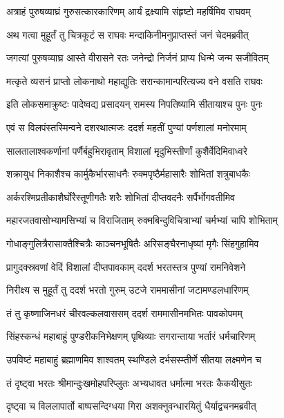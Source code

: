 \twolineshloka
{अत्राहं पुरुषव्याघ्रं गुरुसत्कारकारिणम्}
{आर्यं द्रक्ष्यामि संहृष्टो महर्षिमिव राघवम्} %

\twolineshloka
{अथ गत्वा मुहूर्तं तु चित्रकूटं स राघवः}
{मन्दाकिनीमनुप्राप्तस्तं जनं चेदमब्रवीत्} %

\twolineshloka
{जगत्यां पुरुषव्याघ्र आस्ते वीरासने रतः}
{जनेन्द्रो निर्जनं प्राप्य धिन्मे जन्म सजीवितम्} %

\twolineshloka
{मत्कृते व्यसनं प्राप्तो लोकनाथो महाद्युतिः}
{सरान्कामान्परित्यज्य वने वसति राघवः} %

\twolineshloka
{इति लोकसमाक्रुष्टः पादेष्वद्य प्रसादयन्}
{रामस्य निपतिष्यामि सीतायाश्च पुनः पुनः} %

\twolineshloka
{एवं स विलपंस्तस्मिन्वने दशरथात्मजः}
{ददर्श महतीं पुण्यां पर्णशालां मनोरमाम्} %

\twolineshloka
{सालतालाश्वकर्णानां पर्णैर्बहुभिरावृताम्}
{विशालां मृदुभिस्तीर्णां कुशैर्वेदिमिवाध्वरे} %

\twolineshloka
{शक्रायुध निकाशैश्च कार्मुकैर्भारसाधनैः}
{रुक्मपृष्ठैर्महासारैः शोभितां शत्रुबाधकैः} %

\twolineshloka
{अर्करश्मिप्रतीकाशैर्घोरैस्तूणीगतैः शरैः}
{शोभितां दीप्तवदनैः सर्पैर्भोगवतीमिव} %

\twolineshloka
{महारजतवासोभ्यामसिभ्यां च विराजिताम्}
{रुक्मबिन्दुविचित्राभ्यां चर्मभ्यां चापि शोभिताम्} %

\twolineshloka
{गोधाङ्गुलित्रैरासाक्तैश्चित्रैः काञ्चनभूषितैः}
{अरिसङ्घैरनाधृष्यां मृगैः सिंहगुहामिव} %

\twolineshloka
{प्रागुदक्स्रवणां वेदिं विशालां दीप्तपावकाम्}
{ददर्श भरतस्तत्र पुण्यां रामनिवेशने} %

\twolineshloka
{निरीक्ष्य स मुहूर्तं तु ददर्श भरतो गुरुम्}
{उटजे राममासीनां जटामण्डलधारिणम्} %

\twolineshloka
{तं तु कृष्णाजिनधरं चीरवल्कलवाससम्}
{ददर्श राममासीनमभितः पावकोपमम्} %

\twolineshloka
{सिंहस्कन्धं महाबाहुं पुण्डरीकनिभेक्षणम्}
{पृथिव्याः सगरान्ताया भर्तारं धर्मचारिणम्} %

\twolineshloka
{उपविष्टं महाबाहुं ब्रह्माणमिव शाश्वतम्}
{स्थण्डिले दर्भसस्म्तीर्णे सीतया लक्ष्मणेन च} %

\twolineshloka
{तं दृष्ट्वा भरतः श्रीमान्दुःखमोहपरिप्लुतः}
{अभ्यधावत धर्मात्मा भरतः कैकयीसुतः} %

\twolineshloka
{दृष्ट्वा च विललापार्तो बाष्पसन्दिग्धया गिरा}
{अशक्नुवन्धारयितुं धैर्याद्वचनमब्रवीत्} %

